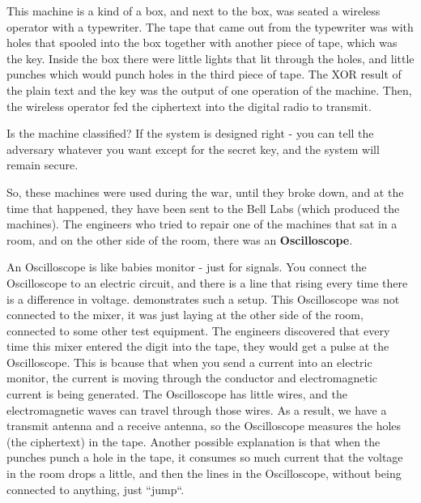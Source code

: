 This machine is a kind of a box, and next to the box, was seated a wireless
operator with a typewriter. The tape that came out from the typewriter was
with holes that spooled into the box together with another piece of tape, which
was the key. Inside the box there were little lights that lit through the holes, and
little punches which would punch holes in the third piece of tape. The XOR result of
the plain text and the key was the output of one operation of the machine. Then, the wireless operator fed the ciphertext into the digital radio to transmit.

Is the machine classified? If the system is designed right - you can tell the
adversary whatever you want except for the secret key, and the system will
remain secure.

So, these machines were used during the war, until they broke down, and at the
time that happened, they have been sent to the Bell Labs (which produced the
machines). The engineers who tried to repair one of the machines that sat in a room,
and on the other side of the room, there was an \textbf{Oscilloscope}. 

An Oscilloscope is like babies monitor - just for signals. You connect the
Oscilloscope to an electric circuit, and there is a line that rising every time
there is a difference in voltage.  demonstrates such a setup.
This Oscilloscope was not connected to the mixer, it was just laying at the other
side of the room, connected to some other test equipment. The engineers
discovered that every time this mixer entered the digit into the tape, they would
get a pulse at the Oscilloscope. This is bcause that when you send a current into an electric monitor, the current is moving through the conductor and electromagnetic current is being generated. The Oscilloscope has little wires, and the electromagnetic
waves can travel through those wires. As a result, we have a transmit antenna and
a receive antenna, so the Oscilloscope measures the holes (the ciphertext) in
the tape. Another possible explanation is that when the punches punch a hole in the
tape, it consumes so much current that the voltage in the room drops a little,
and then the lines in the Oscilloscope, without being connected to anything,
just ``jump``.

